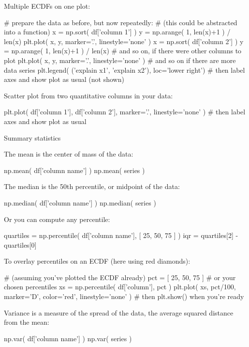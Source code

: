 \documentclass[a4paper,landscape,columns=3]{cheatsheet}
\def\sect#1{\begin{tcolorbox}[colback=blue!5!white,colframe=blue!75!black,size=title,leftrule=2mm]
    \large #1
\end{tcolorbox}}
\begin{document}
Multiple ECDFs on one plot:
\begin{python}
# prepare the data as before, but now repeatedly:
# (this could be abstracted into a function)
x = np.sort( df['column 1'] )
y = np.arange( 1, len(x)+1 ) / len(x)
plt.plot( x, y, marker='.', linestyle='none' )
x = np.sort( df['column 2'] )
y = np.arange( 1, len(x)+1 ) / len(x)
# and so on, if there were other columns to plot
plt.plot( x, y, marker='.', linestyle='none' )
# and so on if there are more data series
plt.legend( ('explain x1', 'explain x2'),
            loc='lower right')
# then label axes and show plot as usual (not shown)
\end{python}

Scatter plot from two quantitative columns in your data:
\begin{python}
plt.plot( df['column 1'], df['column 2'],
          marker='.', linestyle='none' )
# then label axes and show plot as usual
\end{python}

\sect{Summary statistics}

The mean is the center of mass of the data:
\begin{python}
np.mean( df['column name'] )
np.mean( series )
\end{python}

The median is the 50th percentile, or midpoint of the data:
\begin{python}
np.median( df['column name'] )
np.median( series )
\end{python}

Or you can compute any percentile:
\begin{python}
quartiles = np.percentile(
    df['column name'], [ 25, 50, 75 ] )
iqr = quartiles[2] - quartiles[0]
\end{python}

To overlay percentiles on an ECDF (here using red diamonds):
\begin{python}
# (assuming you've plotted the ECDF already)
pct = [ 25, 50, 75 ]  # or your chosen percentiles
xs = np.percentile( df['column'], pct )
plt.plot( xs, pct/100,
          marker='D', color='red', linestyle='none' )
# then plt.show() when you're ready
\end{python}

Variance is a measure of the spread of the data, the average squared distance from the mean:
\begin{python}
np.var( df['column name'] )
np.var( series )
\end{python}
\end{document}
